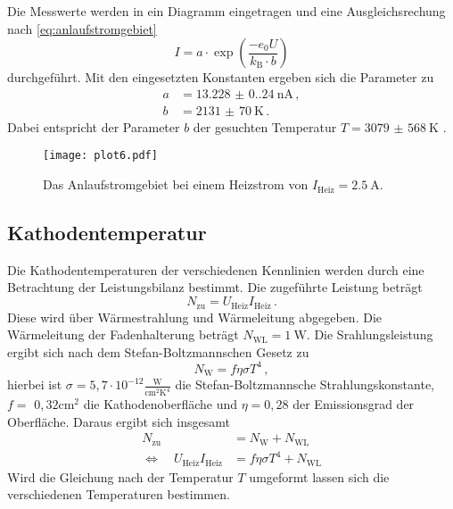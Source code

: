 Die Messwerte werden in ein Diagramm eingetragen und eine Ausgleichsrechung nach \autoref{eq:anlaufstromgebiet}
\begin{equation}
  I=a \cdot \exp \left(\frac{-e_{0} U}{k_{\text{B}} \cdot b}\right)
\end{equation}
durchgeführt. Mit den eingesetzten Konstanten ergeben sich die Parameter zu
\begin{align*}
  a &= \qty{13.228(0.240)}{\nano\ampere} \, , \\
  b &= \qty{2131(70)}{\kelvin} \, . 
\end{align*}
Dabei entspricht der Parameter $b$ der gesuchten Temperatur $T = \qty{3079(568)}{\kelvin}$ .

\begin{figure}
  \centering
  \texttt{[image: plot6.pdf]}
  \caption{Das Anlaufstromgebiet bei einem Heizstrom von $I_\text{Heiz} = \qty{2,5}{\ampere}$.}
  \label{fig:anlaufstrom}
\end{figure}

\subsection{Kathodentemperatur}

Die Kathodentemperaturen der verschiedenen Kennlinien werden durch eine Betrachtung der Leistungsbilanz bestimmt.
Die zugeführte Leistung beträgt
\begin{equation*}
  N_{\text{zu}}=U_{\text{Heiz}} I_{\text{Heiz}} \, .
\end{equation*}
Diese wird über Wärmestrahlung und Wärmeleitung abgegeben. 
Die Wärmeleitung der Fadenhalterung beträgt $N_{\text{WL}} = \qty{1}{\watt}$. 
Die Srahlungsleistung ergibt sich nach dem Stefan-Boltzmannschen Gesetz zu
\begin{equation*}
  N_{\mathrm{W}}=f \eta \sigma T^{4} \, ,
\end{equation*}
hierbei ist $\sigma=5,7 \cdot 10^{-12} \frac{\mathrm{W}}{\mathrm{cm}^{2} \mathrm{K}^{4}}$ die Stefan-Boltzmannsche Strahlungskonstante, 
$f=$ $0,32 \mathrm{cm}^{2}$ die Kathodenoberfläche und $\eta=0,28$ der Emissionsgrad der Oberfläche. 
Daraus ergibt sich insgesamt
\begin{align*}
N_{\mathrm{zu}} &=N_{\mathrm{W}}+N_{\mathrm{WL}} \\
\Leftrightarrow \quad U_{\mathrm{Heiz}} I_{\mathrm{Heiz}} &=f \eta \sigma T^{4}+N_{\mathrm{WL}}
\end{align*}
Wird die Gleichung nach der Temperatur $T$ umgeformt lassen sich die verschiedenen Temperaturen bestimmen.